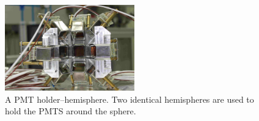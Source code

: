\begin{figure}[h]
   \centering
   \includegraphics[width=0.5\textwidth]{PMTholder.JPG}
   \caption{A PMT holder--hemisphere. Two identical hemispheres are used to hold the PMTS around the sphere.} 
   \label{fig:pmtholder}
\end{figure}

